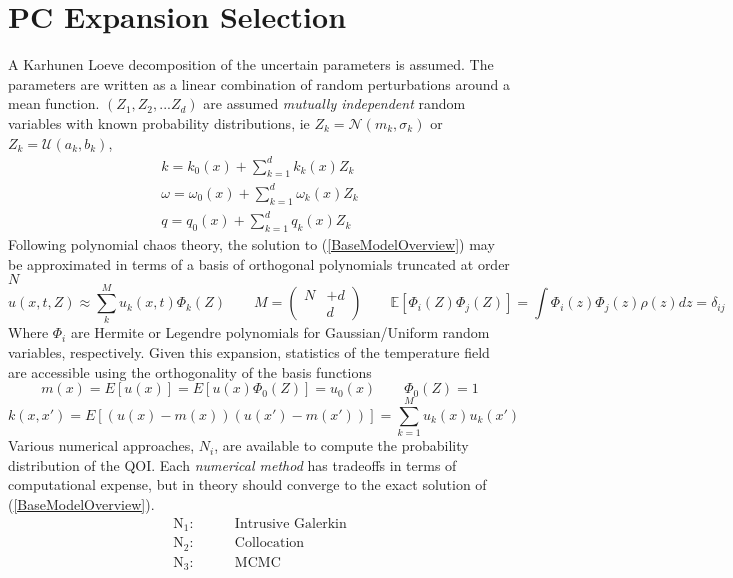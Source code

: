 \documentclass{article}         %
\theoremstyle{definition}
\theoremstyle{remark}
\newcommand{\eqn}[1]{(\ref{#1})}
\begin{document}
\section{PC Expansion Selection }
A Karhunen Loeve decomposition of the uncertain parameters is assumed.
The parameters are written as a linear combination of random perturbations 
around a mean function. $(Z_1,Z_2,...Z_d)$ are assumed \textit{mutually
independent} random variables with
known probability distributions, ie $Z_k = \mathcal{N}(m_k,\sigma_k)$ or $Z_k = \mathcal{U}(a_k,b_k)$,
\[
\begin{split}
k = k_0(x) + \sum_{k=1}^d k_k(x)  Z_k
\\
\omega = \omega_0(x) + \sum_{k=1}^d \omega_k(x)  Z_k
\\
q = q_0(x) + \sum_{k=1}^d q_k(x)  Z_k
\end{split}
\]
Following polynomial chaos theory,
the solution to \eqn{BaseModelOverview} may be approximated in terms of
a basis of orthogonal polynomials truncated at order $N$
\[
u(x,t,Z)  \approx  \sum_k^M u_k(x,t) \Phi_k(Z)
\qquad
M = 
\left(
\begin{split}
N & + d
\\
  & d
\end{split}
\right)
\qquad
\mathbb{E} \left[ \Phi_i (Z) \Phi_j(Z)\right] 
= 
\int  \Phi_i (z) \Phi_j(z) \rho(z) dz
= 
\delta_{ij}
\]
Where $\Phi_i$ are Hermite or Legendre polynomials for
Gaussian/Uniform random variables, respectively.
Given this expansion, statistics of the temperature field
are accessible using the orthogonality of the basis functions
\[
m(x) =  E[u(x)] = E[u(x) \Phi_0(Z)] = u_0(x)
\qquad
\Phi_0(Z) = 1
\]
\[
k(x,x') = E[ (u(x)-m(x)) (u(x')-m(x')) ] = \sum_{k=1}^M u_k(x) u_k(x')
\]
Various numerical approaches, $N_i$, are available to compute 
the probability distribution of the QOI. Each \textit{numerical method}
has tradeoffs in terms of computational expense, but in theory
should converge to the exact solution of \eqn{BaseModelOverview}.
\[
\begin{split}
\text{N}_1:  \qquad &
\text{Intrusive Galerkin}
\\
\text{N}_2:  \qquad &
\text{Collocation}
\\
\text{N}_3: \qquad &
\text{MCMC}
\end{split}
\]
\end{document}
